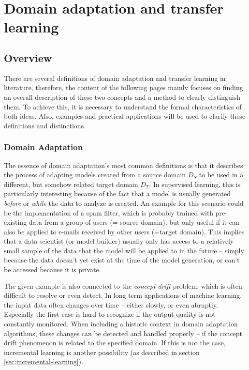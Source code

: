 \chapter{Domain adaptation and transfer learning}
\label{cha:DomainAdaptationTransferLearning}
\section{Overview}
There are several definitions of domain adaptation and transfer learning in literature, therefore, the content of the following pages mainly focuses on finding an overall description of these two concepts and a method to clearly distinguish them. To achieve this, it is necessary to understand the formal characteristics of both ideas. Also, examples and practical applications will be used to clarify these definitions and distinctions.

\subsection{Domain Adaptation}
\label{sec:domain-adaptation}
The essence of domain adaptation's most common definitions is that it describes the process of adapting models created from a source domain $D_{S}$ to be used in a different, but somehow related target domain $D_{T}$. In supervised learning, this is particularly interesting because of the fact that a model is usually generated \textit{before} or \textit{while} the data to analyze is created. An example for this scenario could be the implementation of a spam filter, which is probably trained with pre-existing data from a group of users (= source domain), but only useful if it can also be applied to e-mails received by other users (=target domain). This implies that a data scientist (or model builder) usually only has access to a relatively small sample of the data that the model will be applied to in the future -- simply because the data doesn't yet exist at the time of the model generation, or can't be accessed because it is private. \cite{Ben2010}

The given example is also connected to the \textit{concept drift} problem, which is often difficult to resolve or even detect. In long term applications of machine learning, the input data often changes over time -- either slowly, or even abruptly. Especially the first case is hard to recognize if the output quality is not constantly monitored. When including a historic context in domain adaptation algorithms, these changes can be detected and handled properly -- if the concept drift phenomenon is related to the specified domain. If this is not the case, incremental learning is another possibility (as described in section \ref{sec:incremental-learning}).

